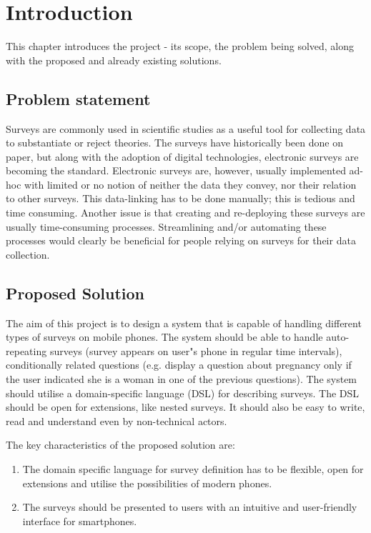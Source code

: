 \chapter{Introduction}
\label{chap:introduction}
This chapter introduces the project - its scope, the problem being solved, along with the proposed and already existing solutions.

\section{Problem statement}
\label{sec:problemstatement}
Surveys are commonly used in scientific studies as a useful tool for collecting data to substantiate or reject theories. The surveys have historically been done on paper, but along with the adoption of digital technologies, electronic surveys are becoming the standard.
Electronic surveys are, however, usually implemented ad-hoc with limited or no notion of neither the data they convey, nor their relation to other surveys. This data-linking has to be done manually; this is tedious and time consuming. Another issue is that creating and re-deploying these surveys are usually time-consuming processes.
Streamlining and/or automating these processes would clearly be beneficial for people relying on surveys for their data collection.

\section{Proposed Solution}
\label{sec:proposedsolution}
The aim of this project is to design a system that is capable of handling different types of surveys on mobile phones. The system should be able to handle auto-repeating surveys (survey appears on user"s phone in regular time intervals), conditionally related questions (e.g. display a question about pregnancy only if the user indicated she is a woman in one of the previous questions).
The system should utilise a domain-specific language (DSL) for describing surveys. The DSL should be open for extensions, like nested surveys. It should also be easy to write, read and understand even by non-technical actors.

The key characteristics of the proposed solution are:

\begin{enumerate}
  \item The domain specific language for survey definition has to be flexible, open for extensions and utilise the possibilities of modern phones.
  \item The surveys should be presented to users with an intuitive and user-friendly interface for smartphones.
\end{enumerate}

